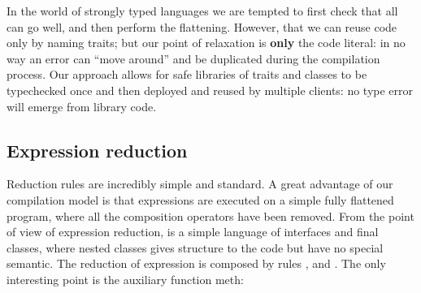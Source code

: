 %
%
%
%



\noindent 
In the world of strongly typed languages we are tempted to
first check that all can go well, and then perform the flattening. However, that we can reuse code only by naming traits; but our point of relaxation is {\bf only} the code literal: in no way an error can ``move around'' and be duplicated during the compilation process.
Our approach allows for safe libraries of traits and classes to be typechecked once and then deployed and reused by multiple clients: no type error will emerge from library code.



\subsection{Expression reduction}
Reduction rules are incredibly simple and standard.
A great advantage of our compilation model is that expressions are executed on
a simple fully flattened program, 
where all the composition operators have been removed.
From the point of view of expression reduction, \name is a simple language of 
interfaces and final classes, where nested classes gives structure to the code but have no special semantic.
The reduction of expression is composed by rules
, and .
The only interesting point is the auxiliary function meth:


